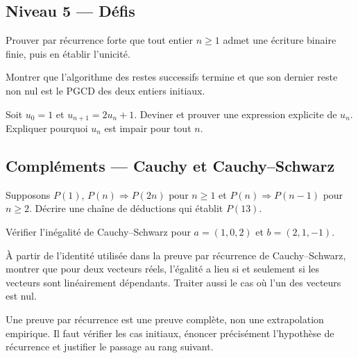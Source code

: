 \subsection*{Niveau 5 — Défis}
\begin{exercice}\label{ex:rec:16}Prouver par récurrence forte que tout entier $n\ge1$ admet une écriture binaire finie, puis en établir l'unicité.\end{exercice}
\begin{exercice}\label{ex:rec:17}Montrer que l'algorithme des restes successifs termine et que son dernier reste non nul est le PGCD des deux entiers initiaux.\end{exercice}
\begin{exercice}\label{ex:rec:18}Soit $u_0=1$ et $u_{n+1}=2u_n+1$. Deviner et prouver une expression explicite de $u_n$. Expliquer pourquoi $u_n$ est impair pour tout $n$.\end{exercice}


\subsection*{Compléments — Cauchy et Cauchy--Schwarz}
\begin{exercice}\label{ex:rec:19}
Supposons $P(1)$, $P(n)\Rightarrow P(2n)$ pour $n\ge1$ et $P(n)\Rightarrow P(n-1)$ pour $n\ge2$.
Décrire une chaîne de déductions qui établit $P(13)$.
\end{exercice}
\begin{exercice}\label{ex:rec:20}
Vérifier l'inégalité de Cauchy--Schwarz pour $a=(1,0,2)$ et $b=(2,1,-1)$.
\end{exercice}
\begin{exercice}\label{ex:rec:21}
À partir de l'identité utilisée dans la preuve par récurrence de Cauchy--Schwarz,
montrer que pour deux vecteurs réels, l'égalité a lieu si et seulement si les vecteurs
sont linéairement dépendants. Traiter aussi le cas où l'un des vecteurs est nul.
\end{exercice}


\begin{retenir}Une preuve par récurrence est une preuve complète, non une extrapolation empirique. Il faut vérifier les cas initiaux, énoncer précisément l'hypothèse de récurrence et justifier le passage au rang suivant.\end{retenir}
